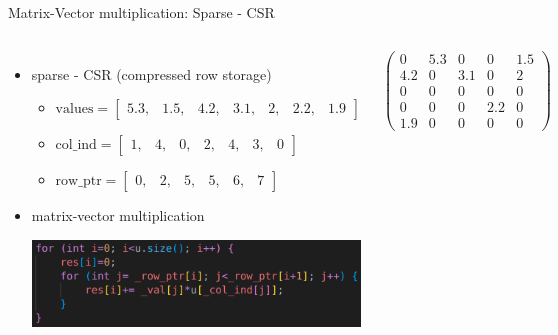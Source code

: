 \documentclass[aspectratio=169,xcolor=dvipsnames]{beamer}
\begin{document}

\begin{frame}{Matrix-Vector multiplication: Sparse - CSR}
    \begin{columns}[c] %

\begin{itemize}
\item sparse - CSR (compressed row storage)
	\begin{itemize}
       \item $\mathrm{values} = \begin{bmatrix}
		5.3, & 1.5, & 4.2, & 3.1, & 2, & 2.2, & 1.9 
		\end{bmatrix}$
		\item $\mathrm{col\_ind} = \begin{bmatrix}
		1, & 4, & 0, & 2, & 4, & 3, & 0 
		\end{bmatrix}$
		\item $\mathrm{row\_ptr} = \begin{bmatrix}
		0, & 2, & 5, & 5, & 6, & 7 
		\end{bmatrix}$
	\end{itemize}
\item matrix-vector multiplication
\begin{center}
    \includegraphics[width=0.8\linewidth]{matrix_vector_csr.png}
    \end{center}
\end{itemize}
        
        $ \left( \begin{array}{rrrrr} 
0 & 5.3 & 0 & 0 & 1.5\\ 
4.2 & 0& 3.1 & 0 & 2\\ 
0 & 0 & 0 & 0 & 0 \\
0 & 0 & 0 & 2.2 & 0 \\
1.9 & 0 & 0 & 0 & 0
\end{array} \right) $

    \end{columns}
\end{frame}
\end{document}
